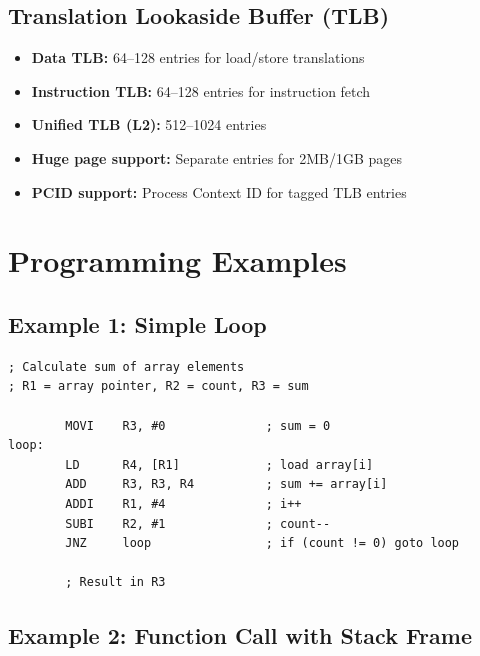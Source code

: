 \documentclass[12pt]{article}
\begin{document}
\subsection{Translation Lookaside Buffer (TLB)}

\begin{itemize}
    \item \textbf{Data TLB:} 64--128 entries for load/store translations
    \item \textbf{Instruction TLB:} 64--128 entries for instruction fetch
    \item \textbf{Unified TLB (L2):} 512--1024 entries
    \item \textbf{Huge page support:} Separate entries for 2MB/1GB pages
    \item \textbf{PCID support:} Process Context ID for tagged TLB entries
\end{itemize}

\section{Programming Examples}

\subsection{Example 1: Simple Loop}

\begin{lstlisting}
; Calculate sum of array elements
; R1 = array pointer, R2 = count, R3 = sum

        MOVI    R3, #0              ; sum = 0
loop:
        LD      R4, [R1]            ; load array[i]
        ADD     R3, R3, R4          ; sum += array[i]
        ADDI    R1, #4              ; i++
        SUBI    R2, #1              ; count--
        JNZ     loop                ; if (count != 0) goto loop
        
        ; Result in R3
\end{lstlisting}

\subsection{Example 2: Function Call with Stack Frame}
\end{document}
